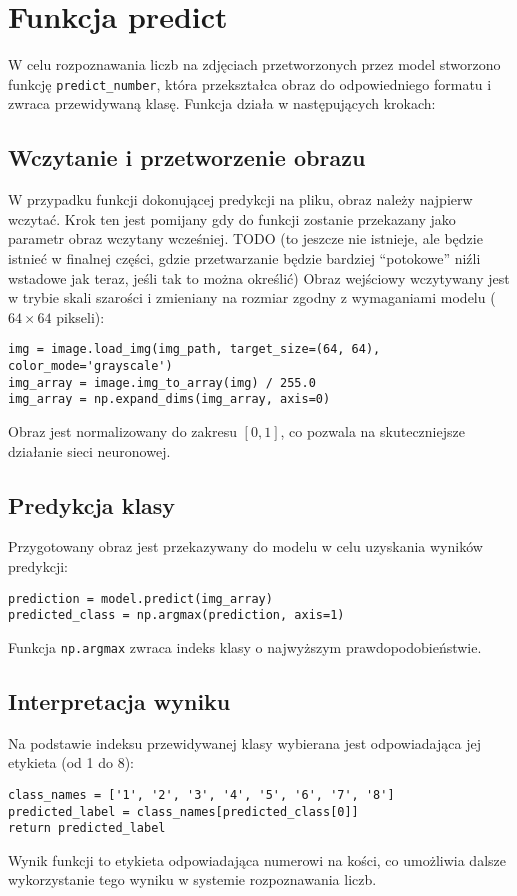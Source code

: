 \section{Funkcja predict}

W celu rozpoznawania liczb na zdjęciach przetworzonych przez model stworzono funkcję \texttt{predict\_number},
która przekształca obraz do odpowiedniego formatu i zwraca przewidywaną klasę.
Funkcja działa w następujących krokach:

\subsection{Wczytanie i przetworzenie obrazu}

W przypadku funkcji dokonującej predykcji na pliku, obraz należy najpierw wczytać. Krok ten jest pomijany gdy do funkcji zostanie przekazany jako parametr obraz wczytany wcześniej.
TODO (to jeszcze nie istnieje, ale będzie istnieć w finalnej części, gdzie przetwarzanie będzie bardziej ``potokowe'' niźli wstadowe jak teraz, jeśli tak to można określić)
Obraz wejściowy wczytywany jest w trybie skali szarości i zmieniany na rozmiar zgodny z wymaganiami modelu ($64 \times 64$ pikseli):

\begin{verbatim}
img = image.load_img(img_path, target_size=(64, 64), color_mode='grayscale')
img_array = image.img_to_array(img) / 255.0
img_array = np.expand_dims(img_array, axis=0)
\end{verbatim}

Obraz jest normalizowany do zakresu $[0, 1]$, co pozwala na skuteczniejsze działanie sieci neuronowej.

\subsection{Predykcja klasy}

Przygotowany obraz jest przekazywany do modelu w celu uzyskania wyników predykcji:

\begin{verbatim}
prediction = model.predict(img_array)
predicted_class = np.argmax(prediction, axis=1)
\end{verbatim}

Funkcja \texttt{np.argmax} zwraca indeks klasy o najwyższym prawdopodobieństwie.

\subsection{Interpretacja wyniku}

Na podstawie indeksu przewidywanej klasy wybierana jest odpowiadająca jej etykieta (od 1 do 8):

\begin{verbatim}
class_names = ['1', '2', '3', '4', '5', '6', '7', '8']
predicted_label = class_names[predicted_class[0]]
return predicted_label
\end{verbatim}

Wynik funkcji to etykieta odpowiadająca numerowi na kości, co umożliwia dalsze wykorzystanie tego wyniku w systemie rozpoznawania liczb.
